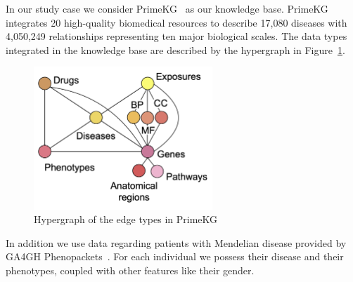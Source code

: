 \documentclass[12pt]{article}
\begin{document}
In our study case we consider PrimeKG~\cite{ChandakPayal2023Bakg} as our knowledge base. PrimeKG integrates 20 high-quality biomedical resources to describe 17,080 diseases with 4,050,249 relationships representing ten major biological scales. The data types integrated in the knowledge base are described by the hypergraph in Figure~\ref{fig:primekg_edge_types_hypergraph}.
\begin{figure}
    \centering
    \includegraphics[width=0.6\textwidth]{figs/edge_types_hypergraph.png}
    \caption{Hypergraph of the edge types in PrimeKG}
    \label{fig:primekg_edge_types_hypergraph}
\end{figure}
In addition we use data regarding patients with Mendelian disease provided by GA4GH Phenopackets~\cite{peter_robinson_2024_13847741}. For each individual we possess their disease and their phenotypes, coupled with other features like their gender.

\printbibliography
\end{document}
